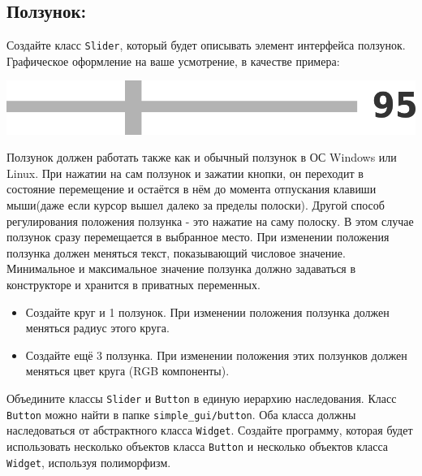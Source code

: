 \documentclass{article}
\begin{document}
\subsection{Ползунок:} 
Создайте класс \texttt{Slider}, который будет описывать элемент интерфейса ползунок. Графическое оформление на ваше усмотрение, в качестве примера:
\begin{center}
\includegraphics[scale=0.6]{../images/slider.png}
\end{center}
Ползунок должен работать также как и обычный ползунок в ОС Windows или Linux. При нажатии на сам ползунок и зажатии кнопки, он переходит в состояние перемещение и остаётся в нём до момента отпускания клавиши мыши(даже если курсор вышел далеко за пределы полоски). Другой способ регулирования положения ползунка - это нажатие на саму полоску. В этом случае ползунок сразу перемещается в выбранное место. При изменении положения ползунка должен меняться текст, показывающий числовое значение. Минимальное и максимальное значение ползунка должно задаваться в конструкторе и хранится в приватных переменных.
\begin{itemize}
\item Создайте круг и 1 ползунок. При изменении положения ползунка должен меняться радиус этого круга.
\item Создайте ещё 3 ползунка. При изменении положения этих ползунков должен меняться цвет круга (RGB компоненты).
\end{itemize}
Объедините классы \texttt{Slider} и \texttt{Button} в единую иерархию наследования. Класс \texttt{Button} можно найти в папке \texttt{simple\_gui/button}. Оба класса должны наследоваться от абстрактного класса \texttt{Widget}. Создайте программу, которая будет использовать несколько объектов класса \texttt{Button} и несколько объектов класса \texttt{Widget}, используя полиморфизм.

\newpage
\end{document}
